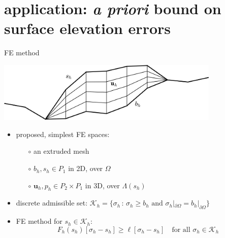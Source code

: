 \documentclass[10pt,svgnames]{beamer}
\newcommand{\bu}{\mathbf{u}}
\newcommand{\cK}{\mathcal{K}}
\newcommand{\cX}{\mathcal{X}}
\begin{document}
\section{application:  \emph{a priori} bound on surface elevation errors}

\begin{frame}{FE method}

\begin{center}
\includegraphics[width=0.8\textwidth]{extruded}
\end{center}

\begin{itemize}
\item proposed, simplest FE spaces:
   \begin{itemize}
   \item[$\circ$] an extruded mesh
   \item[$\circ$] $b_h,s_h \in P_1$ in 2D, over $\Omega$
   \item[$\circ$] $\bu_h,p_h \in P_2 \times P_1$ in 3D, over $\Lambda(s_h)$
   \end{itemize}
\item discrete admissible set: $\cK_h = \{\sigma_h \,:\, \sigma_h \ge b_h \text{ and } {\sigma_h}|_{\partial\Omega} = {b_h}|_{\partial\Omega}\}$
\item FE method for $s_h\in\cK_h$:
   $$F_h(s_h)[\sigma_h-s_h] \ge \ell[\sigma_h-s_h] \quad \text{for all } \sigma_h \in \cK_h$$
\end{itemize}

\phantom{x}
\end{frame}


\newcommand{\result}{
\begin{align*}
\|s_h-s\|_{\cX}^4 &\le \, \frac{c_0}{\Delta t} \int_{\Omega_A(s)} (b - \ell) (b_h - b) \\
   &\quad\, + c_1(s_h) \big\|\bu_h - \bu\big\|_{W^{1,4/3}(\Lambda(s_h))} \\
   &\quad\, + c_2 \|\Pi_h(s) - s\|_{\cX}^{4/3}
\end{align*}
}
\end{document}
